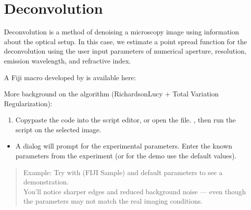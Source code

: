 \documentclass[letterpaper,10pt,english]{jupyterBook}
\begin{document}
\sphinxstepscope


\chapter{Deconvolution}
\label{\detokenize{deconvolution:deconvolution}}\label{\detokenize{deconvolution::doc}}
\sphinxAtStartPar
Deconvolution is a method of denoising a microscopy image using information about the optical
setup. In this case, we estimate a point spread function for the deconvolution using the user
input parameters of numerical aperture, resolution, emission wavelength, and refractive index.

\sphinxAtStartPar
A Fiji macro developed by  is available here:\\

\sphinxAtStartPar
More background on the algorithm (Richardson\sphinxhyphen{}Lucy + Total Variation Regularization):\\
\begin{enumerate}
%
\item {} 
\sphinxAtStartPar
Copy\sphinxhyphen{}paste the code into the script editor, or open the  file. , then run the script on the selected image.

\end{enumerate}

\sphinxAtStartPar
{}
\begin{itemize}
\item {} 
\sphinxAtStartPar
A dialog will prompt for the experimental parameters. Enter the known parameters from the experiment
(or for the demo use the default values).

\end{itemize}

\sphinxAtStartPar
{}
\begin{quote}

\sphinxAtStartPar
Example: Try with  (FIJI Sample) and default parameters to see a demonstration.\\
You’ll notice sharper edges and reduced background noise — even though the parameters may not match the real imaging conditions.
\end{quote}
\end{document}
